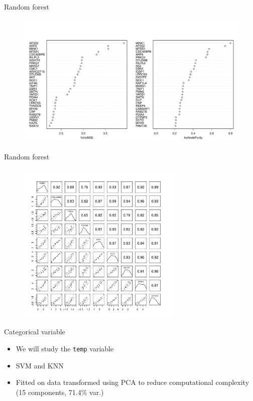 \documentclass{beamer}
\let\OldTexttt\texttt
\renewcommand{\texttt}[1]{\OldTexttt{{\textcolor{islrred}{#1}}}}
\begin{document}
\begin{frame}{Random forest}
 \begin{figure}
  \begin{center}
    \includegraphics[width=\textwidth]{imp_plot_rf.pdf}
  \end{center}
 \end{figure}
\end{frame}

\begin{frame}{Random forest}
  \begin{figure}
    \begin{center}
      \includegraphics[width=0.7\textwidth]{rf_imp_pairs.pdf}
    \end{center}
  \end{figure}
\end{frame}

\begin{frame}{Categorical variable}
  \begin{itemize}
    \item We will study the \texttt{temp} variable 
    \item SVM and KNN
    \item Fitted on data transformed using PCA to reduce computational 
      complexity (15 components, 71.4\% var.)
  \end{itemize}
\end{frame}
\end{document}
